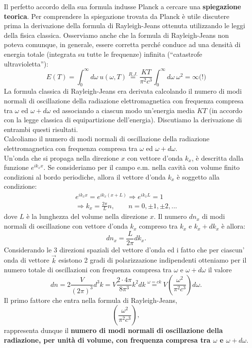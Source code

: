 Il perfetto accordo della sua formula indusse Planck a cercare una \textbf{spiegazione teorica}. Per comprendere la spiegazione trovata da Planck è utile discutere prima la derivazione della formula di Rayleigh-Jeans ottenuta utilizzando le leggi della fisica classica. Osserviamo anche che la formula di  Rayleigh-Jeans non poteva comunque, in generale, essere corretta perché conduce ad una densità di energia totale (integrata su tutte le frequenze) infinita (``catastrofe ultravioletta''):
	\begin{equation}
		E(T) = \int _0 ^\infty d\omega\ u(\omega , T) \overset{R.J.}{=} \frac{KT}{\pi ^2 c ^3}\int _0 ^\infty d\omega \ \omega ^2 = \infty \textrm{(!)}
	\end{equation}
La formula classica di Rayleigh-Jeans era derivata calcolando il numero di modi normali di oscillazione della radiazione elettromagnetica con frequenza compresa tra $\omega$ ed $\omega + d\omega$ ed associando a ciascun modo un'energia media $KT$ (in accordo con la legge classica di equipartizione dell'energia). Discutiamo la derivazione di entrambi questi risultati.\\
Calcoliamo il numero di modi normali di oscillazione della radiazione elettromagnetica con frequenza compresa tra $\omega$ ed $\omega + d\omega$. \\
Un'onda che si propaga nella direzione $x$ con vettore d'onda $k_x$, è descritta dalla funzione $e^{ik_x x}$. Se consideriamo per il campo e.m. nella cavità con volume finito condizioni al bordo periodiche, allora il vettore d'onda $k_x$ è soggetto alla condizione:
	\begin{eqnarray}
		e^{ik_x x}= e^{ik_x (x+L)} \Rightarrow e^{ik_x L}=1  \nonumber\\ \Rightarrow k_x=\frac{2\pi}{L}n, \qquad n= 0, \pm 1, \pm 2,...
	\end{eqnarray}
dove $L$ è la lunghezza del volume nella direzione $x$. Il numero $dn_x$ di modi normali di oscillazione con vettore d'onda $k_x$ compreso tra $k_x$ e $k_x+dk_x$ è allora:
	\begin{equation}
		dn_x =\frac{L}{2\pi}dk_x.
	\end{equation}
Considerando le 3 direzioni spaziali del vettore d'onda ed i fatto che per ciascun' onda di vettore $\vec{k}$ esistono 2 gradi di polarizzazione indipendenti otteniamo per il numero totale di oscillazioni con frequenza compresa tra $\omega$ e $\omega + d\omega$ il valore
	\begin{equation}
		dn =2\frac{V}{(2\pi)^3}d^3k= V \frac{2\cdot 4\pi}{8\pi ^3} k^2 dk \overset{\omega =ck}{=} V \left( \frac{\omega ^2}{\pi ^2 c^3}\right) d\omega .
	\end{equation}
Il primo fattore che entra nella formula di Rayleigh-Jeans,
	\begin{equation}
		\boxed{
			\left( \frac{\omega ^2}{\pi ^2 c^3} \right) ,
		}
		\label{eq:cap1_1}
	\end{equation}
rappresenta dunque il \textbf{numero di modi normali di oscillazione della radiazione, per unità di volume, con frequenza compresa tra $\omega$ e $\omega + d\omega$}.\\


